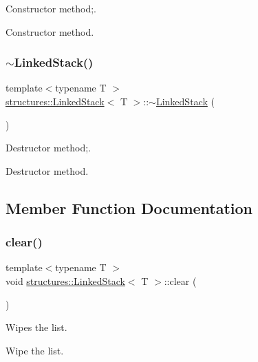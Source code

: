 Constructor method;. 

Constructor method. \mbox{\label{classstructures_1_1_linked_stack_aae17566eb103c92eb22be2e779286f2f}} 
\subsubsection{\texorpdfstring{$\sim$\+Linked\+Stack()}{~LinkedStack()}}
{\footnotesize\ttfamily template$<$typename T $>$ \\
\mbox{\hyperlink{classstructures_1_1_linked_stack}{structures\+::\+Linked\+Stack}}$<$ T $>$\+::$\sim$\mbox{\hyperlink{classstructures_1_1_linked_stack}{Linked\+Stack}} (\begin{DoxyParamCaption}{ }\end{DoxyParamCaption})}



Destructor method;. 

Destructor method. 

\subsection{Member Function Documentation}
\mbox{\label{classstructures_1_1_linked_stack_a56cc909b4a3a0ff7a589f35032ca0ba8}} 
\subsubsection{\texorpdfstring{clear()}{clear()}}
{\footnotesize\ttfamily template$<$typename T $>$ \\
void \mbox{\hyperlink{classstructures_1_1_linked_stack}{structures\+::\+Linked\+Stack}}$<$ T $>$\+::clear (\begin{DoxyParamCaption}{ }\end{DoxyParamCaption})}



Wipes the list. 

Wipe the list. \mbox{\label{classstructures_1_1_linked_stack_ac9704fd697f9c4ed4f7fc4e786114e4f}} 
